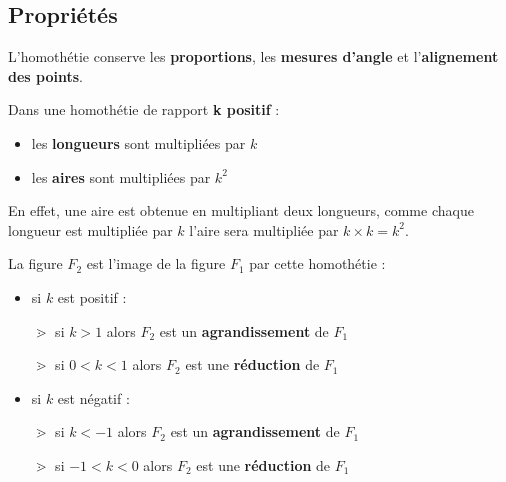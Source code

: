 \subsection{Propriétés}

\begin{propriete}
    L'homothétie conserve les \textbf{proportions}, les \textbf{mesures d'angle} et l'\textbf{alignement des points}. 
\end{propriete}

\begin{propriete}
    Dans une homothétie de rapport \textbf{k positif} : 
    \begin{itemize}
        \item les \textbf{longueurs} sont multipliées par $k$
        \item les \textbf{aires} sont multipliées par $k^2$
    \end{itemize}
\end{propriete}

\begin{preuve}
    En effet, une aire est obtenue en multipliant deux longueurs, comme chaque longueur est multipliée par $k$ l'aire sera multipliée par $k\times k = k^2$.
\end{preuve}    

\begin{propriete}[\admise]
    La figure $F_2$ est l'image de la figure $F_1$ par cette homothétie :
    \begin{itemize}
        \item si $k$ est positif :
        
        \hspace*{1cm}$\gtrdot$ si $k>1$ alors $F_2$ est un \textbf{agrandissement} de $F_1$

        \hspace*{1cm}$\gtrdot$ si $0<k<1$ alors $F_2$ est une \textbf{réduction} de $F_1$
        \item si $k$ est négatif :
        
        \hspace*{1cm}$\gtrdot$ si $k<-1$ alors $F_2$ est un \textbf{agrandissement} de $F_1$

        \hspace*{1cm}$\gtrdot$ si $-1<k<0$ alors $F_2$ est une \textbf{réduction} de $F_1$
    \end{itemize}
\end{propriete}

